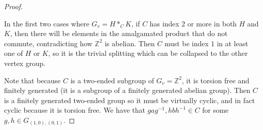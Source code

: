 \documentclass[10pt]{article}
\def\integers{{\mathbb{Z}}}
\theoremstyle{definition}
\begin{document}
\begin{proof}
\begin{center}
\end{center}

In the first two cases where $G_v = H *_C K$, if $C$ has index 2 or more in both $H$ and $K$, then there will be elements in the amalgamated product that do not commute, contradicting how $\integers^2$ is abelian. Then $C$ must be index $1$ in at least one of $H$ or $K$, so it is the trivial splitting which can be collapsed to the other vertex group. 

Note that because $C$ is a two-ended subgroup of $G_v = \integers^2$, it is torsion free and finitely generated (it is a subgroup of a finitely generated abelian group). Then $C$ is a finitely generated two-ended group so it must be virtually cyclic, and in fact cyclic because it is torsion free.  We have that $gag^{-1}, hbh^{-1} \in C$ for some $g, h \in G_{(1,0),(0,1)}$. %



\end{proof}
\end{document}
